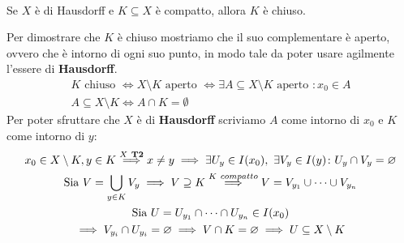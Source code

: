 \begin{theorema}~{}\label{compatto in hausdorff chiuso}\\
Se $X$ è di Hausdorff e $K\subseteq X$ è compatto, allora $K$ è chiuso.
\end{theorema}
\begin{demonstration}
	Per dimostrare che $K$ è chiuso mostriamo che il suo complementare è aperto, ovvero che è intorno di ogni suo punto, in modo tale da poter usare agilmente l'essere di \textbf{Hausdorff}.
		\begin{gather*}
			K \text{ chiuso } \iff X\setminus K \text{ aperto } \iff \exists A\subseteq X\setminus K \text{ aperto } \colon x_0\in A \\
			A\subseteq X\setminus K \iff A\cap K=\emptyset
		\end{gather*}
	Per poter sfruttare che $X$ è di \textbf{Hausdorff} scriviamo $A$ come intorno di $x_0$ e $K$ come intorno di $y$:
		\begin{gather*}
			x_0\in X\setminus K, y\in K \stackrel{X\ \textbf{T2}}{\implies} x\neq y\implies \exists U_y\in I(x_0), \ \exists V_y\in I(y) \colon U_y\cap V_y=\emptyset \\
			\text{Sia } V=\union_{y\in K}V_y \implies V\supseteq K \stackrel{K\ compatto}{\Longrightarrow} V=V_{y_1}\cup\dots\cup V_{y_n}\\
			\text{Sia } U=U_{y_1}\cap\dots\cap U_{y_n} \in I(x_0)\\
			\implies V_{y_i}\cap U_{y_i}=\emptyset \implies V\cap K=\emptyset \implies U\subseteq X\setminus K
		\end{gather*}
\end{demonstration}

